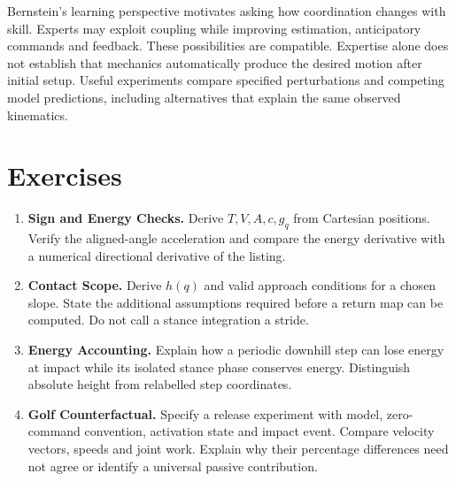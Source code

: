 Bernstein's learning perspective motivates asking how coordination changes
with skill. Experts may exploit coupling while improving estimation,
anticipatory commands and feedback. These possibilities are compatible.
Expertise alone does not establish that mechanics automatically produce the
desired motion after initial setup. Useful experiments compare specified
perturbations and competing model predictions, including alternatives that
explain the same observed kinematics.

\section*{Exercises}
\begin{enumerate}
 \item \textbf{Sign and Energy Checks.} Derive $T,V,A,c,g_q$ from Cartesian
 positions. Verify the aligned-angle acceleration and compare the energy
 derivative with a numerical directional derivative of the listing.
 \item \textbf{Contact Scope.} Derive $h(q)$ and valid approach conditions
 for a chosen slope. State the additional assumptions required before a
 return map can be computed. Do not call a stance integration a stride.
 \item \textbf{Energy Accounting.} Explain how a periodic downhill step
 can lose energy at impact while its isolated stance phase conserves energy.
 Distinguish absolute height from relabelled step coordinates.
 \item \textbf{Golf Counterfactual.} Specify a release experiment with
 model, zero-command convention, activation state and impact event. Compare
 velocity vectors, speeds and joint work. Explain why their percentage
 differences need not agree or identify a universal passive contribution.
\end{enumerate}
